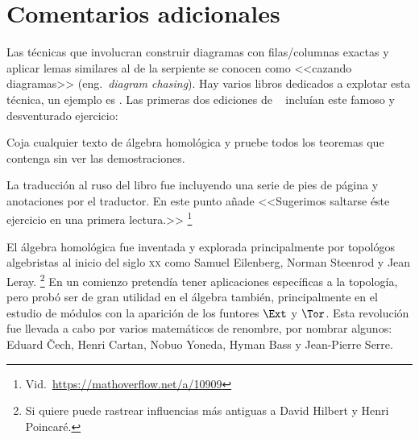 \documentclass[11pt, reqno]{amsart}
\begin{document}
\section{Comentarios adicionales}
Las técnicas que involucran construir diagramas con filas/columnas exactas y aplicar lemas similares al de la serpiente
se conocen como <<cazando diagramas>> (eng.\ \emph{diagram chasing}).
Hay varios libros dedicados a explotar esta técnica, un ejemplo es \cite{maclane:homology}.
Las primeras dos ediciones de \citeauthor{lang:algebra}~\cite{lang:algebra} incluían este famoso y desventurado ejercicio:
\begin{displayquote}
	Coja cualquier texto de álgebra homológica y pruebe todos los teoremas que contenga sin ver las demostraciones.
\end{displayquote}
La traducción al ruso del libro fue incluyendo una serie de pies de página y anotaciones por el traductor.
En este punto añade <<Sugerimos saltarse éste ejercicio en una primera lectura.>>%
\footnote{Vid.\ \url{https://mathoverflow.net/a/10909}}

El álgebra homológica fue inventada y explorada principalmente por topológos algebristas al inicio del siglo \textsc{xx}
como Samuel Eilenberg, Norman Steenrod y Jean Leray.%
\footnote{Si quiere puede rastrear influencias más antiguas a David Hilbert y Henri Poincaré.}
En un comienzo pretendía tener aplicaciones específicas a la topología, pero probó ser de gran utilidad en el álgebra
también, principalmente en el estudio de módulos con la aparición de los funtores $\Ext$ y $\Tor$.
Esta revolución fue llevada a cabo por varios matemáticos de renombre, por nombrar algunos: Eduard \v Cech, Henri
Cartan, Nobuo Yoneda, Hyman Bass y Jean-Pierre Serre.


\printbibliography
\end{document}

